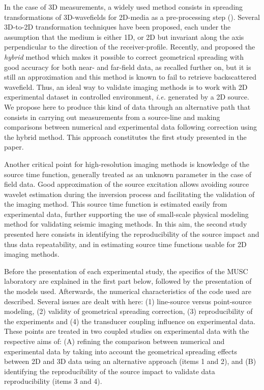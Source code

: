 \documentclass[extra,mreferee]{gji}
\begin{document}
In the case of 3D measurements, a widely used method consists in spreading transformations of 3D-wavefields for 2D-media as a pre-processing step (\cite{crase1990robust,shipp2002two,ravaut2004multiscale,wang2009reflection,bretaudeau2013fwi}). Several 3D-to-2D transformation techniques have been proposed, each under the assumption that the medium is either 1D, or 2D but invariant along the axis perpendicular to the direction of the receiver-profile. Recently, \cite{Forbriger_LSS_2014} and \cite{schafer2014lss} proposed the \textit{hybrid} method which makes it possible to correct geometrical spreading with good accuracy for both near- and far-field data, as recalled further on, but it is still an approximation and this method is known to fail to retrieve backscattered wavefield. Thus, an ideal way to validate imaging methods is to work with 2D experimental dataset in controlled environment, \textit{i.e.} generated by a 2D source. We propose here to produce this kind of data through an alternative path that consists in carrying out measurements from a source-line and making comparisons between numerical and experimental data following correction using the hybrid method. This approach constitutes the first study presented in the paper.

Another critical point for high-resolution imaging methods is knowledge of the source time function, generally treated as an unknown parameter in the case of field data. Good approximation of the source excitation allows avoiding source wavelet estimation during the inversion process and facilitating the validation of the imaging method. This source time function is estimated easily from experimental data, further supporting the use of small-scale physical modeling method for validating seismic imaging methods. In this aim, the second study presented here consists in identifying the reproducibility of the source impact and thus data repeatability, and in estimating source time functions usable for 2D imaging methods.

Before the presentation of each experimental study, the specifics of the MUSC laboratory are explained in the first part below, followed by the presentation of the models used. Afterwards, the numerical characteristics of the code used are described. Several issues are dealt with here: (1) line-source versus point-source modeling, (2) validity of geometrical spreading correction, (3) reproducibility of the experiments and (4) the transducer coupling influence on experimental data. These points are treated in two coupled studies on experimental data with the respective aims of: (A) refining the comparison between numerical and experimental data by taking into account the geometrical spreading effects between 2D and 3D data using an alternative approach (items 1 and 2), and (B) identifying the reproducibility of the source impact to validate data reproducibility (items 3 and 4).
\end{document}
